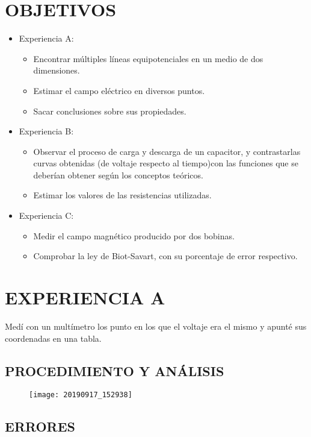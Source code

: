 \documentclass[10pt, twoside]{article}
\begin{document}
\section{OBJETIVOS}
\begin{itemize}
	\item Experiencia A:
		\begin{itemize}
			\item Encontrar múltiples líneas equipotenciales en un medio de dos dimensiones.
			\item Estimar el campo eléctrico en diversos puntos.
			\item Sacar conclusiones sobre sus propiedades.
		\end{itemize}
	\item Experiencia B:
		\begin{itemize}
			\item Observar el proceso de carga y descarga de un capacitor,
				y contrastarlas curvas obtenidas (de voltaje respecto al tiempo)con las funciones
				que se deberían obtener según los conceptos teóricos.
			\item Estimar los valores de las resistencias utilizadas.
		\end{itemize}
	\item Experiencia C:
		\begin{itemize}
			\item Medir el campo magnético producido por dos bobinas.
			\item Comprobar la ley de Biot-Savart, con su porcentaje de error respectivo.
		\end{itemize}
\end{itemize}
\section{EXPERIENCIA A}
Medí con un multímetro los punto en los que el voltaje era el mismo
y apunté sus coordenadas en una tabla.

\subsection{PROCEDIMIENTO Y ANÁLISIS}%
\begin{figure}[H]
	\centering
	\texttt{[image: 20190917\_152938]}
\end{figure}
\subsection{ERRORES}%
\end{document}
